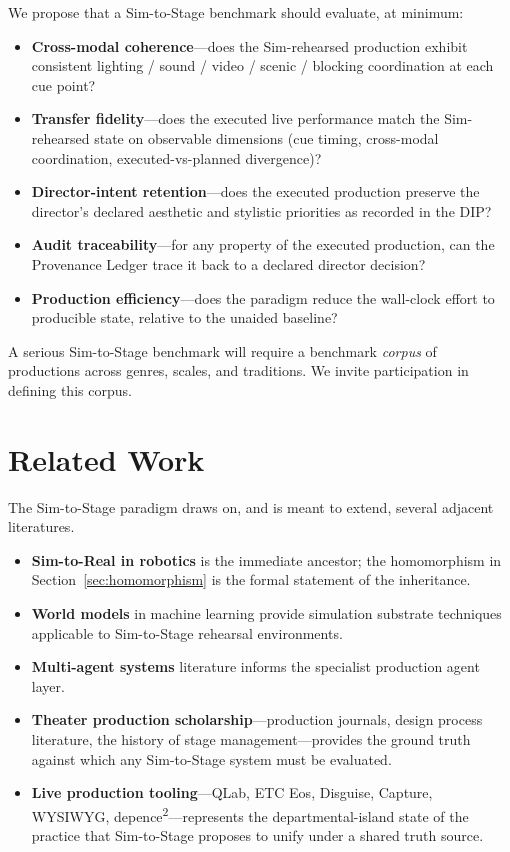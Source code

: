 \documentclass[11pt]{article}
\begin{document}
We propose that a Sim-to-Stage benchmark should evaluate, at minimum:

\begin{itemize}
\item \textbf{Cross-modal coherence}---does the Sim-rehearsed production
      exhibit consistent lighting / sound / video / scenic / blocking
      coordination at each cue point?
\item \textbf{Transfer fidelity}---does the executed live performance match
      the Sim-rehearsed state on observable dimensions (cue timing,
      cross-modal coordination, executed-vs-planned divergence)?
\item \textbf{Director-intent retention}---does the executed production
      preserve the director's declared aesthetic and stylistic priorities
      as recorded in the DIP?
\item \textbf{Audit traceability}---for any property of the executed
      production, can the Provenance Ledger trace it back to a declared
      director decision?
\item \textbf{Production efficiency}---does the paradigm reduce the
      wall-clock effort to producible state, relative to the unaided
      baseline?
\end{itemize}

A serious Sim-to-Stage benchmark will require a benchmark \emph{corpus}
of productions across genres, scales, and traditions.  We invite
participation in defining this corpus.

\section{Related Work}

The Sim-to-Stage paradigm draws on, and is meant to extend, several
adjacent literatures.

\begin{itemize}
\item \textbf{Sim-to-Real in robotics} is the immediate ancestor; the
      homomorphism in Section~\ref{sec:homomorphism} is the formal
      statement of the inheritance.
\item \textbf{World models} in machine learning provide simulation substrate
      techniques applicable to Sim-to-Stage rehearsal environments.
\item \textbf{Multi-agent systems} literature informs the specialist
      production agent layer.
\item \textbf{Theater production scholarship}---production journals, design
      process literature, the history of stage management---provides the
      ground truth against which any Sim-to-Stage system must be evaluated.
\item \textbf{Live production tooling}---QLab, ETC Eos, Disguise, Capture,
      WYSIWYG, depence\textsuperscript{2}---represents the
      departmental-island state of the practice that Sim-to-Stage proposes
      to unify under a shared truth source.
\end{itemize}
\end{document}
